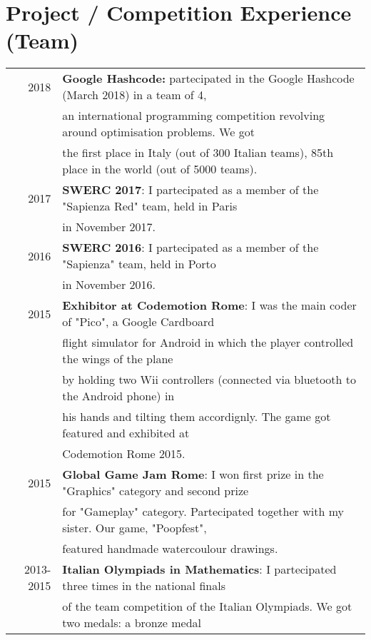 \documentclass[a4paper,10pt]{article} %
\begin{document}

\section{Project / Competition Experience (Team)}
\begin{tabular}{rl}
2018 &  \textbf{Google Hashcode:} partecipated in the Google Hashcode (March 2018) in a team of 4,\\
     & an international programming competition revolving around optimisation problems. We got \\
     & the first place in Italy (out of 300 Italian teams), 85th place in the world (out of 5000 teams). \\
2017 &  \textbf{SWERC 2017}: I partecipated as a member of the "Sapienza Red" team, held in Paris\\
     & in November 2017.\\
2016 &  \textbf{SWERC 2016}: I partecipated as a member of the "Sapienza" team, held in Porto\\
     & in November 2016.\\
2015 &  \textbf{Exhibitor at Codemotion Rome}: I was the main coder of "Pico", a Google Cardboard \\
     & flight simulator for Android in which the player controlled the wings of the plane \\
     & by holding two Wii controllers (connected via bluetooth to the Android phone) in \\
     & his hands and tilting them accordignly. The game got featured and exhibited at \\
     & Codemotion Rome 2015.\\
2015 &  \textbf{Global Game Jam Rome}: I won first prize in the "Graphics" category and second prize \\
     & for "Gameplay" category. Partecipated together with my sister. Our game, "Poopfest",\\
     & featured handmade watercoulour drawings.\\
2013-2015 & \textbf{Italian Olympiads in Mathematics}: I partecipated three times in the national finals\\
     & of the team competition of the Italian Olympiads. We got two medals: a bronze medal \\

\end{tabular}
\end{document}
